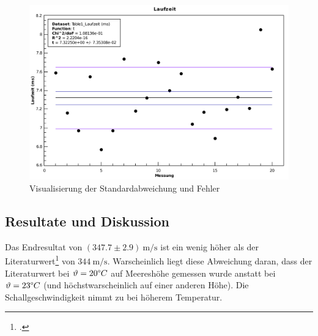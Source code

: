 \begin{figure}[H]
    \center
    \includegraphics[width=.85\textwidth]{qtiplot/schallgeschwindigkeit}
    \caption{Visualisierung der Standardabweichung und Fehler}
    \label{fig:schallgeschwindigkeit}
\end{figure}

\subsection{Resultate und Diskussion}

Das Endresultat von $(347.7\pm2.9)\SI{}{\meter\per\second}$ ist ein wenig h\"oher als der
Literaturwert\footcite{ref:schallgeschwindigkeit} von $\SI{344}{\meter\per\second}$.
Warscheinlich liegt diese Abweichung daran, dass der Literaturwert bei $\vartheta=20\degree C$
auf Meeresh\"ohe gemessen wurde anstatt bei $\vartheta=23\degree C$ (und h\"ochstwarscheinlich
auf einer anderen H\"ohe). Die Schallgeschwindigkeit nimmt zu bei h\"oherem Temperatur.

